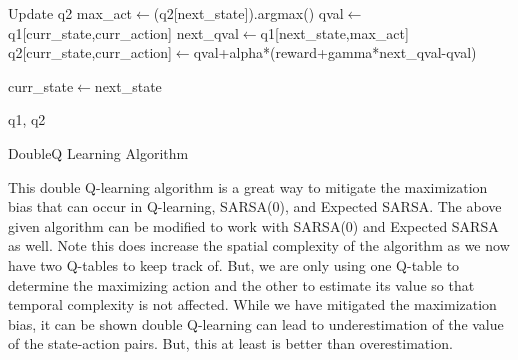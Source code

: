\begin{algorithm}[H]
\begin{algorithmic}[1]
                \Else \Comment Update q2
                    \State max\_act$\gets$(q2[next\_state]).argmax()
                    \State qval$\gets$q1[curr\_state,curr\_action]
                    \State next\_qval$\gets$q1[next\_state,max\_act]
                    \State q2[curr\_state,curr\_action]$\gets$qval+alpha*(reward+gamma*next\_qval-qval)

                \EndIf

                \State curr\_state$\gets$next\_state
            
            \EndWhile

        \EndFor

        \State \Return q1, q2
    \EndProcedure

\end{algorithmic}
\caption{DoubleQ Learning Algorithm}
\label{alg:double_q}
\end{algorithm}

This double Q-learning algorithm is a great way to mitigate the maximization bias that can occur in Q-learning, SARSA(0), and Expected SARSA.
The above given algorithm can be modified to work with SARSA(0) and Expected SARSA as well.
Note this does increase the spatial complexity of the algorithm as we now have two Q-tables to keep track of.
But, we are only using one Q-table to determine the maximizing action and the other to estimate its value so that temporal complexity is not affected.
While we have mitigated the maximization bias, it can be shown double Q-learning can lead to underestimation of the value of the state-action pairs.
But, this at least is better than overestimation.